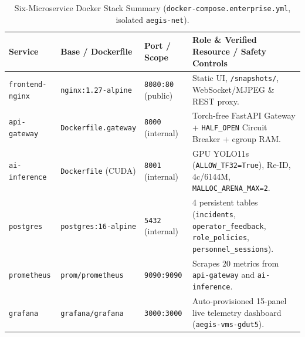 \begin{table}[H]
\centering
\caption{Six-Microservice Docker Stack Summary (\nolinkurl{docker-compose.enterprise.yml}, isolated \texttt{aegis-net}).}
\label{tab:app_enterprise_stack}
\scriptsize\setlength{\tabcolsep}{4pt}
\renewcommand{\arraystretch}{1.08}
\begin{tabularx}{\textwidth}{|p{2.9cm}|p{2.9cm}|p{2.3cm}|X|}
\hline
\rowcolor{slatehdr}
\textbf{Service} & \textbf{Base / Dockerfile} & \textbf{Port / Scope} & \textbf{Role \& Verified Resource / Safety Controls} \\
\hline
\texttt{frontend-nginx} & \texttt{nginx:1.27-alpine} & \texttt{8080:80} (public) & Static UI, \texttt{/snapshots/}, WebSocket/MJPEG \& REST proxy. \\ \hline
\texttt{api-gateway} & \nolinkurl{Dockerfile.gateway} & \texttt{8000} (internal) & Torch-free FastAPI Gateway + \texttt{HALF\_OPEN} Circuit Breaker + cgroup RAM. \\ \hline
\texttt{ai-inference} & \texttt{Dockerfile} (CUDA) & \texttt{8001} (internal) & GPU YOLO11s (\texttt{ALLOW\_TF32=True}), Re-ID, 4c/6144M, \texttt{MALLOC\_ARENA\_MAX=2}. \\ \hline
\texttt{postgres} & \texttt{postgres:16-alpine} & \texttt{5432} (internal) & 4 persistent tables (\texttt{incidents}, \nolinkurl{operator_feedback}, \nolinkurl{role_policies}, \nolinkurl{personnel_sessions}). \\ \hline
\texttt{prometheus} & \texttt{prom/prometheus} & \texttt{9090:9090} & Scrapes 20 metrics from \texttt{api-gateway} and \texttt{ai-inference}. \\ \hline
\texttt{grafana} & \texttt{grafana/grafana} & \texttt{3000:3000} & Auto-provisioned 15-panel live telemetry dashboard (\texttt{aegis-vms-gdut5}). \\ \hline
\end{tabularx}
\end{table}

